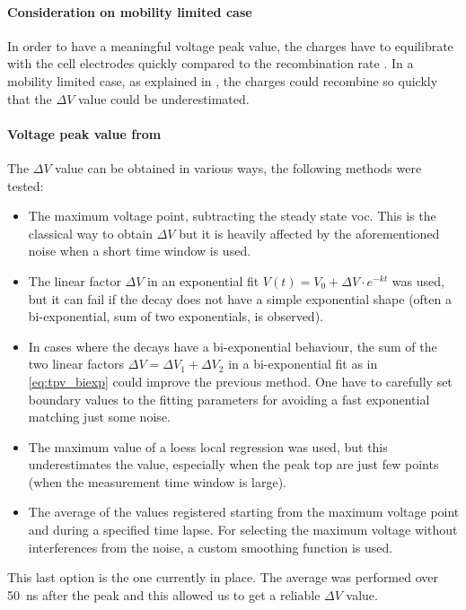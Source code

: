 \paragraph{Consideration on mobility limited case}
	In order to have a meaningful voltage peak value, the charges have to equilibrate with the cell electrodes quickly compared to the recombination rate \cite{Credgington2014}.
	In a mobility limited case, as explained in , the charges could recombine so quickly that the $\Delta V$ value could be underestimated.

	\paragraph{Voltage peak value from }\label{tpv_deltaV}
	The $\Delta V$ value can be obtained in various ways, the following methods were tested:
	\begin{itemize}
		\item The maximum voltage point, subtracting the steady state \gls{voc}. This is the classical way to obtain $\Delta V$ but it is heavily affected by the aforementioned noise when a short time window is used.
		\item The linear factor $\Delta V$ in an exponential fit $V (t) = V_0 + \Delta V \cdot e^{-kt}$ was used, but it can fail if the decay does not have a simple exponential shape (often a bi-exponential, sum of two exponentials, is observed).
		\item In cases where the  decays have a bi-exponential behaviour, the sum of the two linear factors $\Delta V = \Delta V_1 + \Delta V_2$ in a bi-exponential fit as in \cref{eq:tpv_biexp} could improve the previous method. One have to carefully set boundary values to the fitting parameters for avoiding a fast exponential matching just some noise.
		\item The maximum value of a \gls{loess} local regression was used, but this underestimates the value, especially when the peak top are just few points (when the measurement time window is large).
		\item The average of the values registered starting from the maximum voltage point and during a specified time lapse. For selecting the maximum voltage without interferences from the noise, a custom smoothing function is used.
	\end{itemize}
	This last option is the one currently in place. 
	The average was performed over \SI{50}{\nano\s} after the peak and this allowed us to get a reliable $\Delta V$ value.
